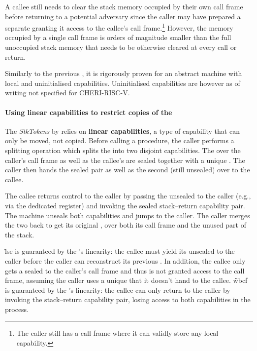 \documentclass[main.tex]{subfiles}
\begin{document}
A callee still needs to clear the stack memory occupied by their own call frame before returning to a potential adversary since the caller may have prepared a separate  granting it access to the callee's call frame.\footnote{The caller still has a call frame where it can validly store any local capability.} However, the memory occupied by a single call frame is orders of magnitude smaller than the full unoccupied stack memory that needs to be otherwise cleared at every call or return.

Similarly to the previous , it is rigorously proven for an abstract machine with local and uninitialised capabilities. Uninitialised capabilities are however as of writing not specified for CHERI-RISC-V.

\paragraph{Using linear capabilities to restrict copies of the } The \emph{StkTokens}  by \cite{stktokens} relies on \textbf{linear capabilities}, a type of capability that can only be moved, not copied. Before calling a procedure, the caller performs a splitting operation which splits the  into two disjoint capabilities. The  over the caller's call frame as well as the callee's  are sealed together with a unique . The caller then hands the sealed pair as well as the second (still unsealed)  over to the callee.

The callee returns control to the caller by passing the unsealed  to the caller (e.g., via the dedicated  register) and invoking the sealed stack–return capability pair. The machine unseals both capabilities and jumps to the caller. The caller merges the two  back to get its original , over both its call frame and the unused part of the stack.

\G{lse} is guaranteed by the 's linearity: the callee must yield its unsealed  to the caller before the caller can reconstruct its previous . In addition, the callee only gets a sealed  to the caller's call frame and thus is not granted access to the call frame, assuming the caller uses a unique  that it doesn't hand to the callee. \G{wbcf} is guaranteed by the 's linearity: the callee can only return to the caller by invoking the stack–return capability pair, losing access to both capabilities in the process.
\end{document}
